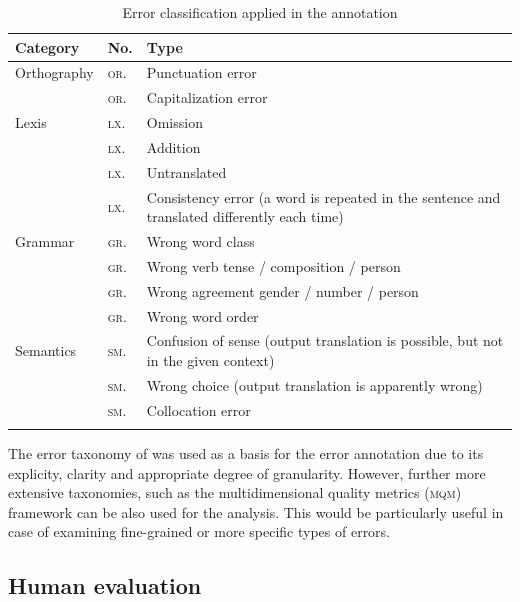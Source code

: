 \documentclass[output=paper]{langsci/langscibook}
\begin{document}
\begin{table}
\begin{tabularx}{\textwidth}{llQ}
\lsptoprule
Category  &
No. &
Type\\
\midrule
Orthography  &  \textsc{or}. & Punctuation error\\
             &  \textsc{or}.  &  Capitalization error\\
\midrule
Lexis  &     \textsc{lx}.   &   Omission\\
       &     \textsc{lx}. &   Addition\\
       &     \textsc{lx}. &   Untranslated\\
       &     \textsc{lx}. &  Consistency error (a word is repeated in the sentence  and translated differently each time)\\
\midrule
Grammar  &   \textsc{gr}.  &    Wrong word class\\
         &   \textsc{gr}.  &    Wrong verb tense / composition / person\\
         &   \textsc{gr}.  &    Wrong agreement gender / number / person\\
         &   \textsc{gr}.  &    Wrong word order\\
\midrule
Semantics & \textsc{sm}. & Confusion of sense (output translation is possible,  but not in the given context)\\
          & \textsc{sm}. &  Wrong choice (output translation is apparently wrong)\\\
          & \textsc{sm}. & Collocation error\\
\lspbottomrule
\end{tabularx}
\caption{Error classification applied in the annotation\label{marzouk:table1}}
\end{table}


The error taxonomy of \citet{Vilar2006} was used as a basis for the error annotation due to its explicity, clarity and appropriate degree of granularity. However, further more extensive taxonomies, such as the multidimensional quality metrics (\textsc{mqm}) framework can be also used for the analysis. This would be particularly useful in case of examining fine-grained or more specific types of errors.


\subsection{Human evaluation}\largerpage
\end{document}
